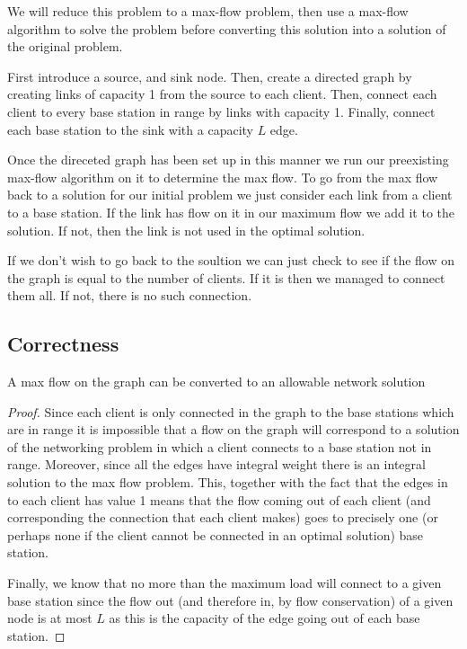 \documentclass{article}
\begin{document}
We will reduce this problem to a max-flow problem, then use a max-flow algorithm to solve the problem before converting this solution into a solution of the original problem.

First introduce a source, and sink node. Then, create a directed graph by creating links of capacity 1 from the source to each client. Then, connect each client to every base station in range by links with capacity 1. Finally, connect each base station to the sink with a capacity $L$ edge.

Once the direceted graph has been set up in this manner we run our preexisting max-flow algorithm on it to determine the max flow. To go from the max flow back to a solution for our initial problem we just consider each link from a client to a base station. If the link has flow on it in our maximum flow we add it to the solution. If not, then the link is not used in the optimal solution.

If we don't wish to go back to the soultion we can just check to see if the flow on the graph is equal to the number of clients. If it is then we managed to connect them all. If not, there is no such connection.

\subsection{Correctness}

A max flow on the graph can be converted to an allowable network solution
\begin{proof}
Since each client is only connected in the graph to the base stations which are in range it is impossible that a flow on the graph will correspond to a solution of the networking problem in which a client connects to a base station not in range. Moreover, since all the edges have integral weight there is an integral solution to the max flow problem.  This, together with the fact that the edges in to each client has value 1 means that the flow coming out of each client (and corresponding the connection that each client makes) goes to precisely one (or perhaps none if the client cannot be connected in an optimal solution) base station.

Finally, we know that no more than the maximum load will connect to a given base station since the flow out (and therefore in, by flow conservation) of a given node is at most $L$ as this is the capacity of the edge going out of each base station.
\end{proof}
\end{document}
